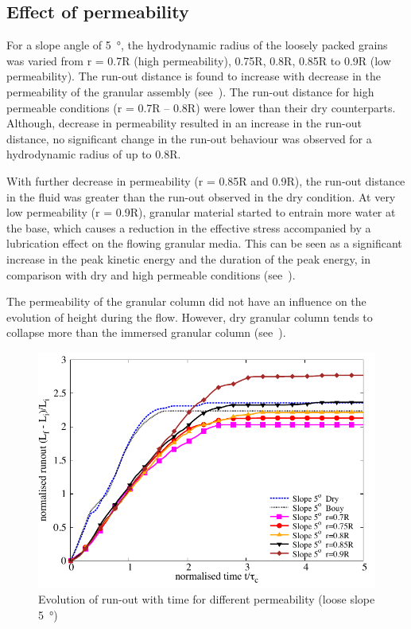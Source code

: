\subsection{Effect of permeability}

For a slope angle of \SI{5}{\degree}, the hydrodynamic radius of the loosely 
packed grains was varied from r = 0.7R (high permeability), 0.75R, 0.8R, 0.85R 
to 0.9R (low permeability). The run-out distance is found to increase with 
decrease in the permeability of the granular assembly (see~). 
The run-out distance for high permeable conditions (r = 0.7R -- 0.8R) were 
lower than their dry counterparts. Although, decrease in permeability resulted 
in an increase in the run-out distance, no significant change in the run-out 
behaviour was observed for a hydrodynamic radius of up to 0.8R.

With further decrease in permeability (r = 0.85R and 0.9R), the run-out 
distance in the fluid was greater than the run-out observed in the dry 
condition. At very low permeability (r = 0.9R), granular material started to 
entrain more water at the base, which causes a reduction in the effective 
stress accompanied by a lubrication effect on the flowing granular media. This 
can be seen as a significant increase in the peak kinetic energy and the 
duration of the peak energy, in comparison with dry and high permeable 
conditions (see~).

The permeability of the granular column did not have an influence on the evolution of height during the flow. However, dry granular column tends to collapse more than the immersed granular column (see~).

\begin{figure}
\centering
\includegraphics[width=0.97\columnwidth]{Runout_loose_5_slope}
\caption{Evolution of run-out with time for different permeability (loose slope \SI{5}{\degree})}
\label{fig:run5}
\end{figure}


